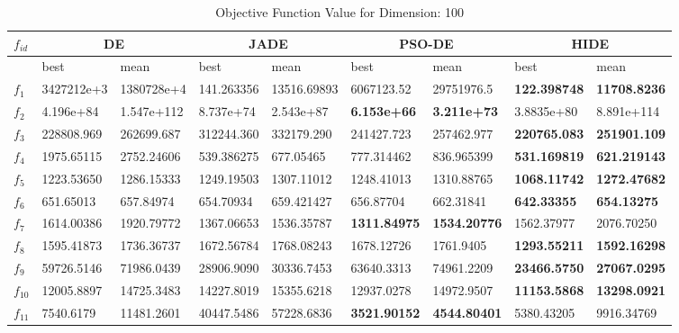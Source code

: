 \begin{table*}[b!]
\centering
\caption{Objective Function Value for Dimension: 100}
 \begin{tabular}{|p{0.8cm}|p{1.6cm}|p{1.6cm}|p{1.6cm}|p{1.6cm}|p{1.6cm}|p{1.6cm}|p{1.6cm}|p{1.6cm}|} 
\hline
$f_{id}$ & \multicolumn{2}{c|}{DE} & \multicolumn{2}{c|}{JADE} & \multicolumn{2}{c|}{PSO-DE} & \multicolumn{2}{c|}{HIDE} \\
\hline
    & best & mean & best & mean & best & mean & best & mean \\ [0.5ex] 
\hline
$f_{1}$  & 3427212e+3 & 1380728e+4 & 141.263356 & 13516.69893 & 6067123.52 & 29751976.5 & \textbf{122.398748} & \textbf{11708.8236} \\ 
$f_{2}$  & 4.196e+84 & 1.547e+112 & 8.737e+74 & 2.543e+87 & \textbf{6.153e+66} & \textbf{3.211e+73} & 3.8835e+80 & 8.891e+114 \\ 
$f_{3}$  & 228808.969 & 262699.687 & 312244.360 & 332179.290 & 241427.723 & 257462.977 & \textbf{220765.083} & \textbf{251901.109} \\ 
$f_{4}$  & 1975.65115 & 2752.24606 & 539.386275 & 677.05465 & 777.314462 & 836.965399 & \textbf{531.169819} & \textbf{621.219143} \\ 
$f_{5}$  & 1223.53650 & 1286.15333 & 1249.19503 & 1307.11012 & 1248.41013 & 1310.88765 & \textbf{1068.11742} & \textbf{1272.47682} \\ 
$f_{6}$  & 651.65013 & 657.84974 & 654.70934 & 659.421427 & 656.87704 & 662.31841 & \textbf{642.33355} & \textbf{654.13275} \\ 
$f_{7}$  & 1614.00386 & 1920.79772 & 1367.06653 & 1536.35787 & \textbf{1311.84975} & \textbf{1534.20776} & 1562.37977 & 2076.70250 \\ 
$f_{8}$  & 1595.41873 & 1736.36737 & 1672.56784 & 1768.08243 & 1678.12726 & 1761.9405 & \textbf{1293.55211} & \textbf{1592.16298} \\ 
$f_{9}$  & 59726.5146 & 71986.0439 & 28906.9090 & 30336.7453 & 63640.3313 & 74961.2209 & \textbf{23466.5750} & \textbf{27067.0295} \\ 
$f_{10}$  & 12005.8897 & 14725.3483 & 14227.8019 & 15355.6218 & 12937.0278 & 14972.9507 & \textbf{11153.5868} & \textbf{13298.0921} \\ 
$f_{11}$  & 7540.6179 & 11481.2601 & 40447.5486 & 57228.6836 & \textbf{3521.90152} & \textbf{4544.80401} & 5380.43205 & 9916.34769 \\ 

\end{tabular}
\end{table*}
